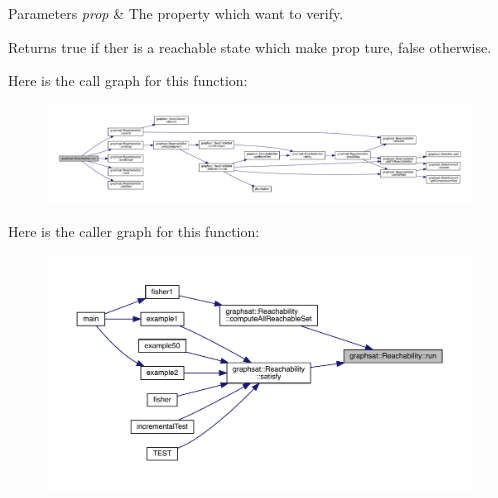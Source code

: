 \begin{DoxyParams}{Parameters}
{\em prop} & The property which want to verify.\\
\hline
\end{DoxyParams}
\begin{DoxyReturn}{Returns}
true if ther is a reachable state which make prop ture, false otherwise. 
\end{DoxyReturn}
Here is the call graph for this function\+:
\nopagebreak
\begin{figure}[H]
\begin{center}
\leavevmode
\includegraphics[width=350pt]{classgraphsat_1_1_reachability_a183579baabbe4b26c93a0887d8460d3c_cgraph}
\end{center}
\end{figure}
Here is the caller graph for this function\+:
\nopagebreak
\begin{figure}[H]
\begin{center}
\leavevmode
\includegraphics[width=350pt]{classgraphsat_1_1_reachability_a183579baabbe4b26c93a0887d8460d3c_icgraph}
\end{center}
\end{figure}
\mbox{\label{classgraphsat_1_1_reachability_abeea89b7c1d9d21616ff3efb31c5c4f2}} 
